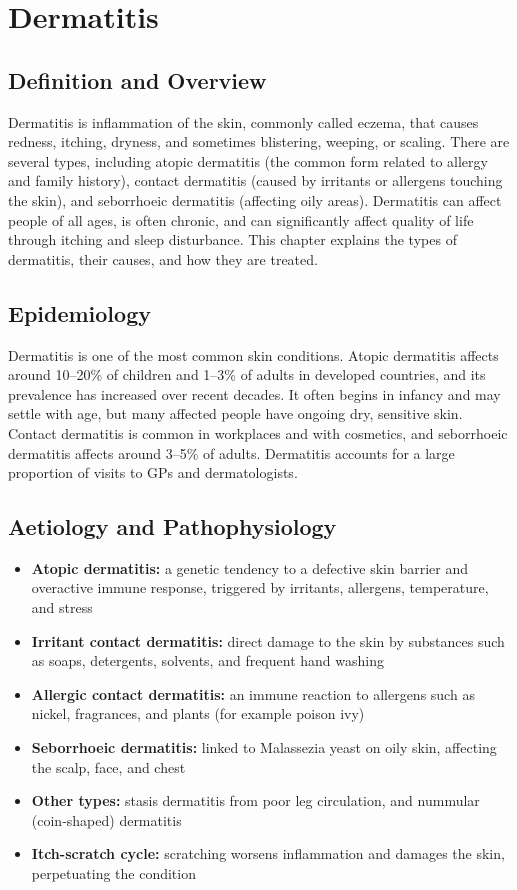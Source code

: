 \chapter{Dermatitis}

\section*{Definition and Overview}
Dermatitis is inflammation of the skin, commonly called eczema, that causes redness, itching, dryness, and sometimes blistering, weeping, or scaling. There are several types, including atopic dermatitis (the common form related to allergy and family history), contact dermatitis (caused by irritants or allergens touching the skin), and seborrhoeic dermatitis (affecting oily areas). Dermatitis can affect people of all ages, is often chronic, and can significantly affect quality of life through itching and sleep disturbance. This chapter explains the types of dermatitis, their causes, and how they are treated.

\section*{Epidemiology}
Dermatitis is one of the most common skin conditions. Atopic dermatitis affects around 10--20\% of children and 1--3\% of adults in developed countries, and its prevalence has increased over recent decades. It often begins in infancy and may settle with age, but many affected people have ongoing dry, sensitive skin. Contact dermatitis is common in workplaces and with cosmetics, and seborrhoeic dermatitis affects around 3--5\% of adults. Dermatitis accounts for a large proportion of visits to GPs and dermatologists.

\section*{Aetiology and Pathophysiology}
\begin{itemize}
    \item \textbf{Atopic dermatitis:} a genetic tendency to a defective skin barrier and overactive immune response, triggered by irritants, allergens, temperature, and stress
    \item \textbf{Irritant contact dermatitis:} direct damage to the skin by substances such as soaps, detergents, solvents, and frequent hand washing
    \item \textbf{Allergic contact dermatitis:} an immune reaction to allergens such as nickel, fragrances, and plants (for example poison ivy)
    \item \textbf{Seborrhoeic dermatitis:} linked to Malassezia yeast on oily skin, affecting the scalp, face, and chest
    \item \textbf{Other types:} stasis dermatitis from poor leg circulation, and nummular (coin-shaped) dermatitis
    \item \textbf{Itch-scratch cycle:} scratching worsens inflammation and damages the skin, perpetuating the condition
\end{itemize}

